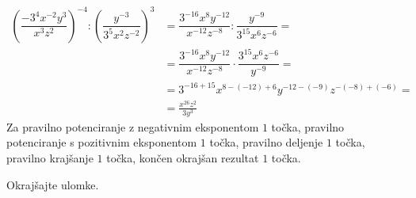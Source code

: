 \documentclass[addpoints]{exam}
\begin{document}
\begin{questions}
\begin{parts}
            \begin{solution}[2cm]
                \begin{align*}
                    \left(\dfrac{-3^4x^{-2}y^3}{x^3z^2}\right)^{-4} : \left(\dfrac{y^{-3}}{3^5x^2z^{-2}}\right)^3 &= \dfrac{3^{-16}x^{8}y^{-12}}{x^{-12}z^{-8}} : \dfrac{y^{-9}}{3^{15}x^6z^{-6}}= \\
                                                                                                                    &= \dfrac{3^{-16}x^{8}y^{-12}}{x^{-12}z^{-8}} \cdot \dfrac{3^{15}x^6z^{-6}}{y^{-9}}= \\
                                                                                                                    &= 3^{-16+15}x^{8-(-12)+6}y^{-12-(-9)}z^{-(-8)+(-6)}= \\
                                                                                                                    &=\frac{x^{26}z^2}{3y^3}
                \end{align*}
                Za pravilno potenciranje z negativnim eksponentom $1$ točka, pravilno potenciranje s pozitivnim eksponentom $1$ točka, pravilno deljenje $1$ točka, pravilno krajšanje $1$ točka, končen okrajšan rezultat $1$ točka.
            \end{solution}
    
    
        \end{parts}
   
   
   
   
        \newpage

    \question
    Okrajšajte ulomke.
\end{questions}
\end{document}
